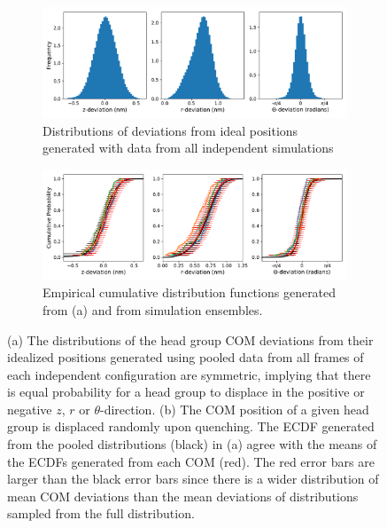 \documentclass{article}
\begin{document}
  \begin{figure}[!htb]
  \centering
  \begin{subfigure}{\textwidth}
  \includegraphics[width=\textwidth]{sandwiched_ensemble_pooled.pdf}
  \caption{Distributions of deviations from ideal positions generated with data
  from all independent simulations}\label{fig:offset_ensemble_pooled}
  \end{subfigure}
  \begin{subfigure}{\textwidth}
  \includegraphics[width=\textwidth]{sandwiched_ecdfs.pdf}
  \caption{Empirical cumulative distribution functions generated from (a) and
  from simulation ensembles.}\label{fig:offset_ecdfs}
  \end{subfigure}
  \caption{(a) The distributions of the head group COM deviations
  from their idealized positions generated using pooled data from all
  frames of each independent configuration are symmetric, implying that 
  there is equal probability for a head group to displace in the positive
  or negative $z$, $r$ or $\theta$-direction. (b) The COM position of a 
  given head group is displaced randomly upon quenching. The ECDF generated from
  the pooled distributions (black) in (a) agree with the means of the 
  ECDFs generated from each COM (red). The red error bars are larger than
  the black error bars since there is a wider distribution of mean COM
  deviations than the mean deviations of distributions sampled from the full
  distribution.}\label{fig:full_ensemble_distributions}
  \end{figure} 
\end{document}
